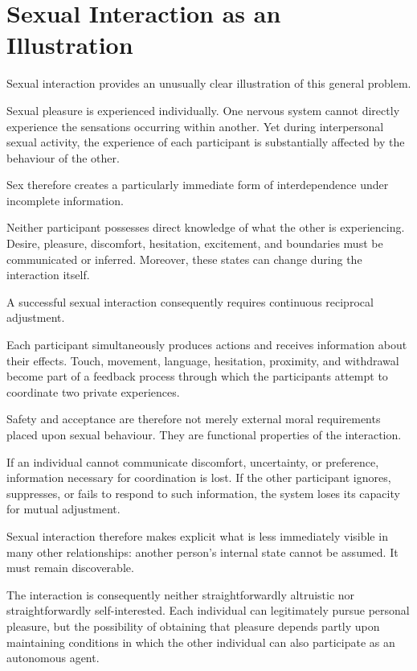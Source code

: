 \documentclass[11pt, a4paper]{article}
\begin{document}
\section*{Sexual Interaction as an Illustration}
Sexual interaction provides an unusually clear illustration of this general problem.

Sexual pleasure is experienced individually. One nervous system cannot directly experience the sensations occurring within another. Yet during interpersonal sexual activity, the experience of each participant is substantially affected by the behaviour of the other.

Sex therefore creates a particularly immediate form of interdependence under incomplete information.

Neither participant possesses direct knowledge of what the other is experiencing. Desire, pleasure, discomfort, hesitation, excitement, and boundaries must be communicated or inferred. Moreover, these states can change during the interaction itself.

A successful sexual interaction consequently requires continuous reciprocal adjustment.

Each participant simultaneously produces actions and receives information about their effects. Touch, movement, language, hesitation, proximity, and withdrawal become part of a feedback process through which the participants attempt to coordinate two private experiences.

Safety and acceptance are therefore not merely external moral requirements placed upon sexual behaviour. They are functional properties of the interaction.

If an individual cannot communicate discomfort, uncertainty, or preference, information necessary for coordination is lost. If the other participant ignores, suppresses, or fails to respond to such information, the system loses its capacity for mutual adjustment.

Sexual interaction therefore makes explicit what is less immediately visible in many other relationships: another person's internal state cannot be assumed. It must remain discoverable.

The interaction is consequently neither straightforwardly altruistic nor straightforwardly self-interested. Each individual can legitimately pursue personal pleasure, but the possibility of obtaining that pleasure depends partly upon maintaining conditions in which the other individual can also participate as an autonomous agent.
\end{document}
